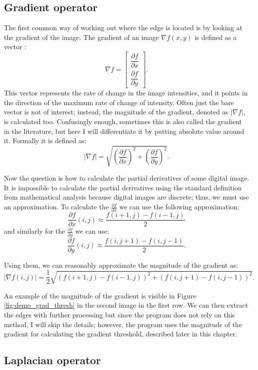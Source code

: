 \documentclass[
  digital,     %
  oneside,     %
  nosansbold,  %
  nocolorbold, %
  lof,         %
  lot,         %
]{fithesis4}
\begin{document}
\subsection{Gradient operator}

The first common way of working out where the edge is located is by looking at
the gradient of the image. The gradient of an image $\nabla f(x,y)$ is defined
as a vector \cite{gonzalez2002}:
$$\nabla f =
\begin{bmatrix}
    \dfrac{\partial f}{\partial x}\\[2ex]
    \dfrac{\partial f}{\partial y}
\end{bmatrix}.$$
This vector represents the rate of change in the image intensities, and it points in
the direction of the maximum rate of change of intensity. Often just the bare
vector is not of interest; instead, the magnitude of the gradient, denoted as
$|\nabla f|$, is calculated too. Confusingly enough, sometimes this is also called
the gradient in the literature, but here I will differentiate it by putting
absolute value around it. Formally it is defined as:
$$|\nabla f| = \sqrt{\left(\frac{\partial f}{\partial x}\right)^2 +
\left(\frac{\partial f}{\partial y}\right)^2}.$$

Now the question is how to calculate the partial derivatives of some digital image.
It is impossible to calculate the partial derivatives using the standard
definition from mathematical analysis because digital images are discrete; thus,
we must use an approximation. To calculate the $\frac{\partial f}{\partial x}$
we can use the following approximation:
$$\frac{\partial f}{\partial x}(i, j) \approx \frac{f(i+1,j)-f(i-1,j)}{2}$$
and similarly for the $\frac{\partial f}{\partial y}$ we can use:
$$\frac{\partial f}{\partial y}(i, j) \approx \frac{f(i, j+1)-f(i,j-1)}{2}.$$

Using them, we can reasonably approximate the magnitude of the gradient as:
$$|\nabla f(i, j)| = \frac{1}{2}\sqrt{(f(i+1, j) - f(i-1, j))^2 + (f(i, j+1) - f(i, j-1))^2}.$$

An example of the magnitude of the gradient is visible in Figure
\ref{fig:demo_grad_thresh} in the second image in the first row.
We can then extract the edges with further processing but since the program
does not rely on this method, I will skip the details; however, the program uses
the magnitude of the gradient for calculating the gradient threshold, described later
in this chapter.

\subsection{Laplacian operator}
\end{document}
